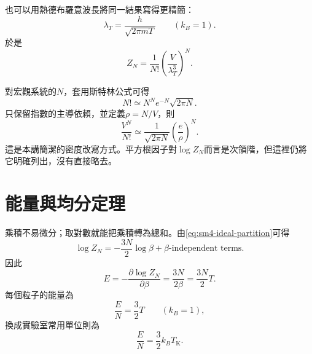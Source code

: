 也可以用熱德布羅意波長將同一結果寫得更精簡：
\begin{equation}
 \lambda_T=\frac{h}{\sqrt{2\pi mT}}
 \qquad (k_B=1).
\end{equation}
於是
\begin{equation}
 Z_N=\frac{1}{N!}\left(\frac{V}{\lambda_T^3}\right)^N.
 \label{eq:sm4-thermal-wavelength-form}
\end{equation}

對宏觀系統的\(N\)，套用斯特林公式可得
\begin{equation}
 N!\simeq N^Ne^{-N}\sqrt{2\pi N}.
\end{equation}
只保留指數的主導依賴，並定義\(\rho=N/V\)，則
\begin{equation}
 \frac{V^N}{N!}
 \simeq
 \frac{1}{\sqrt{2\pi N}}
 \left(\frac{e}{\rho}\right)^N.
 \label{eq:sm4-density-rewrite}
\end{equation}
這是本講簡潔的密度改寫方式。平方根因子對\(\log Z_N\)而言是次領階，但這裡仍將它明確列出，沒有直接略去。

\begin{classroomqa}
\end{classroomqa}

\section{能量與均分定理}

乘積不易微分；取對數就能把乘積轉為總和。由\eqref{eq:sm4-ideal-partition}可得
\begin{equation}
 \log Z_N
 =-\frac{3N}{2}\log\beta+\text{\(\beta\)-independent terms}.
 \label{eq:sm4-log-ideal-partition}
\end{equation}
因此
\begin{equation}
 E
 =-\frac{\partial\log Z_N}{\partial\beta}
 =\frac{3N}{2\beta}
 =\frac{3N}{2}T.
 \label{eq:sm4-ideal-energy}
\end{equation}
每個粒子的能量為
\begin{equation}
 \frac{E}{N}=\frac{3}{2}T
 \qquad (k_B=1),
\end{equation}
換成實驗室常用單位則為
\begin{equation}
 \frac{E}{N}=\frac{3}{2}k_BT_{\mathrm K}.
 \label{eq:sm4-ideal-energy-lab}
\end{equation}

